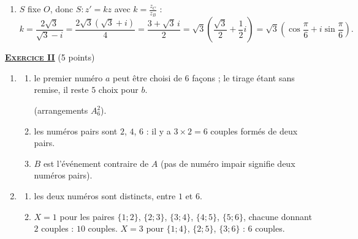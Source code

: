\begin{enumerate}
\begin{enumerate}
		\end{enumerate}
		\item {}
			$S$ fixe $O$, donc $S : z' = kz$ avec $k = \frac{z_C}{z_B}$ :
			\[
				k = \frac{2\sqrt{3}}{\sqrt{3} - i} = \frac{2\sqrt{3}\left(\sqrt{3} + i\right)}{4} = \frac{3 + \sqrt{3}\,i}{2}
				= \sqrt{3}\left(\frac{\sqrt{3}}{2} + \frac{1}{2}i\right) = \sqrt{3}\left(\cos\frac{\pi}{6} + i\sin\frac{\pi}{6}\right).
			\]

	\end{enumerate}
\noindent \underline{\textsc{\textbf{Exercice II}}} (5 points)
	\begin{enumerate}
		\item \begin{enumerate}
			\item {}
				le premier numéro $a$ peut être choisi de $6$ façons ; le tirage étant sans remise, il reste $5$ choix pour $b$.

				 (arrangements $A_6^2$).
			\item {}
				les numéros pairs sont $2$, $4$, $6$ : il y a $3\times2 = 6$ couples formés de deux pairs.

			\item {}
				$B$ est l'événement contraire de $A$ (pas de numéro impair signifie deux numéros pairs).

		\end{enumerate}
		\item \begin{enumerate}
			\item {} les deux numéros sont distincts, entre $1$ et $6$.

			\item {}
				$X = 1$ pour les paires $\{1;2\}$, $\{2;3\}$, $\{3;4\}$, $\{4;5\}$, $\{5;6\}$, chacune donnant $2$ couples : $10$ couples.
				$X = 3$ pour $\{1;4\}$, $\{2;5\}$, $\{3;6\}$ : $6$ couples.


\end{enumerate}
\end{enumerate}
